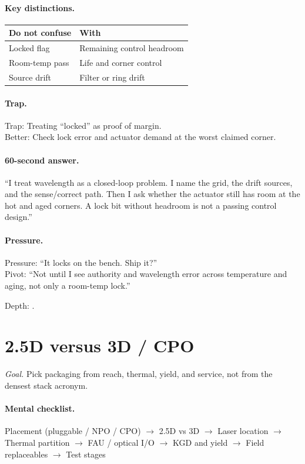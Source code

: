 \paragraph{Key distinctions.}
\begin{center}
\footnotesize
\begin{tabular}{@{}ll@{}}
\toprule
Do not confuse & With \\
\midrule
Locked flag & Remaining control headroom \\
Room-temp pass & Life and corner control \\
Source drift & Filter or ring drift \\
\bottomrule
\end{tabular}
\end{center}

\paragraph{Trap.}
Trap: Treating ``locked'' as proof of margin.\\
Better: Check lock error and actuator demand at the worst claimed corner.

\paragraph{60-second answer.}
``I treat wavelength as a closed-loop problem. I name the grid, the drift
sources, and the sense/correct path. Then I ask whether the actuator still has
room at the hot and aged corners. A lock bit without headroom is not a passing
control design.''

\paragraph{Pressure.}
Pressure: ``It locks on the bench. Ship it?''\\
Pivot: ``Not until I see authority and wavelength error across temperature and
aging, not only a room-temp lock.''

\footnotesize Depth: .

\clearpage
\section{2.5D versus 3D / CPO}
\label{sec:cheat-pkg}

\textit{Goal.} Pick packaging from reach, thermal, yield, and service, not from
the densest stack acronym.

\paragraph{Mental checklist.}
Placement (pluggable / NPO / CPO) $\rightarrow$ 2.5D vs 3D $\rightarrow$
Laser location $\rightarrow$ Thermal partition $\rightarrow$ FAU / optical I/O
$\rightarrow$ KGD and yield $\rightarrow$ Field replaceables $\rightarrow$
Test stages

